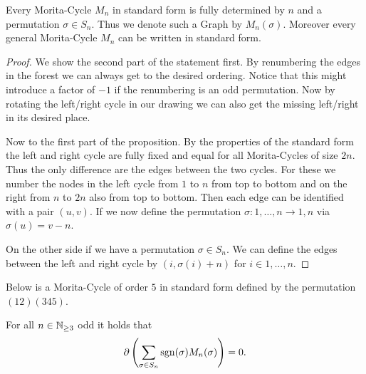 \begin{proposition}
	Every Morita-Cycle $M_{n}$ in standard form is fully determined by $n$ and a permutation $\sigma \in S_{n}$. Thus we denote 
	such a Graph by $M_{n}(\sigma)$.
	Moreover every general Morita-Cycle $M_{n}$ can be written in standard form.
\end{proposition}

\begin{proof}
	We show the second part of the statement first.
	By renumbering the edges in the forest we can always get to the desired ordering. Notice that this might introduce a factor of $-1$
	if the renumbering is an odd permutation.
	Now by rotating the left/right cycle in our drawing we can also get the missing left/right in its desired place.

	Now to the first part of the proposition.
	By the properties of the standard form the left and right cycle are fully fixed and equal for all Morita-Cycles of size $2 n$.
	Thus the only difference are the edges between the two cycles.
	For these we number the nodes in the left cycle from $1$ to $n$ from top to bottom
	and on the right from $n$ to  $2 n$ also from top to bottom. Then each edge can be identified with a pair $(u,v)$.
	If we now define the permutation $\sigma: {1,\ldots,n} \to {1,n}$ via $\sigma(u) = v - n$.

	On the other side if we have a permutation $\sigma \in S_{n}$. We can define the edges between the left and right cycle
	by $(i,\sigma(i) +n)$ for $i \in {1,\ldots,n}$.
\end{proof}

\begin{eg}
	Below is a Morita-Cycle of order $5$ in standard form defined by the permutation $(12)(345)$.
\end{eg}

\begin{theorem}
	For all $n \in \mathbb{N}_{\geq 3}$ odd it holds that 
	\[
		\partial\left(\sum_{\sigma \in S_{n}} \operatorname{sgn}(\sigma) M_{n}(\sigma)\right) = 0
	.\] 
\end{theorem}

